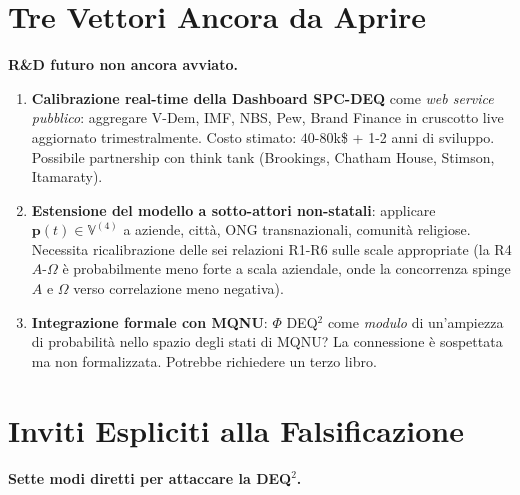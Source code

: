 \section{Tre Vettori Ancora da
Aprire}\label{tre-vettori-ancora-da-aprire}

\Hypoth{} \textbf{R\&D futuro non ancora avviato.}

\begin{enumerate}
\def\labelenumi{\arabic{enumi}.}
\tightlist
\item
  \textbf{Calibrazione real-time della Dashboard SPC-DEQ} come \emph{web
  service pubblico}: aggregare V-Dem, IMF, NBS, Pew, Brand Finance in
  cruscotto live aggiornato trimestralmente. Costo stimato:
  \(40\)-\(80\)k\$ + 1-2 anni di sviluppo. Possibile partnership con
  think tank (Brookings, Chatham House, Stimson, Itamaraty).
\item
  \textbf{Estensione del modello a sotto-attori non-statali}: applicare
  \(\boldsymbol{p}(t) \in \mathbb{V}^{(4)}\) a aziende, città, ONG
  transnazionali, comunità religiose. Necessita ricalibrazione delle sei
  relazioni R1-R6 sulle scale appropriate (la R4 \(A\)-\(\Omega\) è
  probabilmente meno forte a scala aziendale, onde la concorrenza spinge
  \(A\) e \(\Omega\) verso correlazione meno negativa).
\item
  \textbf{Integrazione formale con MQNU}: \(\Phi\) DEQ$^2$ come
  \emph{modulo} di un'ampiezza di probabilità nello spazio degli stati
  di MQNU? La connessione è sospettata ma non formalizzata. Potrebbe
  richiedere un terzo libro.
\end{enumerate}



\section{Inviti Espliciti alla
Falsificazione}\label{inviti-espliciti-alla-falsificação}

\Hypoth{} \textbf{Sette modi diretti per attaccare la DEQ$^2$.}

